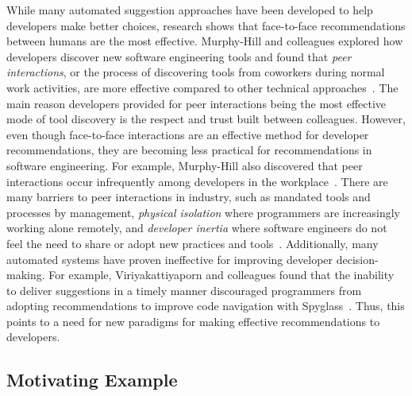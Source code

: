 While many automated suggestion approaches have been developed to help developers make better choices, research shows that face-to-face recommendations between humans are the most effective. Murphy-Hill and colleagues explored how developers discover new software engineering tools and found that \textit{peer interactions}, or the process of discovering tools from coworkers during normal work activities, are more effective compared to other technical approaches~\cite{Murphy-Hill2011PeerInteraction}. The main reason developers provided for peer interactions being the most effective mode of tool discovery is the respect and trust built between colleagues. However, even though face-to-face interactions are an effective method for developer recommendations, they are becoming less practical for recommendations in software engineering. For example, Murphy-Hill also discovered that peer interactions occur infrequently among developers in the workplace~\cite{Murphy-Hill2011PeerInteraction}. There are many barriers to peer interactions in industry, such as mandated tools and processes by management, \textit{physical isolation} where programmers are increasingly working alone remotely, and \textit{developer inertia} where software engineers do not feel the need to share or adopt new practices and tools~\cite{Murphy-Hill2015HowDoUsers}. Additionally, many automated systems have proven ineffective for improving developer decision-making. For example, Viriyakattiyaporn and colleagues found that the inability to deliver suggestions in a timely manner discouraged programmers from adopting recommendations to improve code navigation with Spyglass~\cite{viriyakattiyaporn2009challenges}. Thus, this points to a need for new paradigms for making effective recommendations to developers.

\subsection{Motivating Example}

